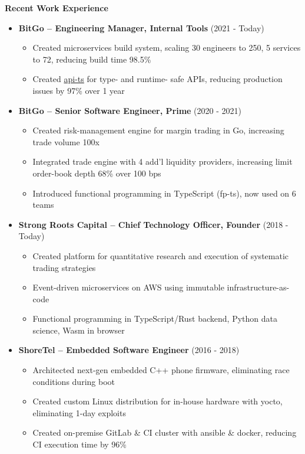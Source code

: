 \documentclass{report}
\begin{document}
\textbf{Recent Work Experience}
\begin{itemize}[label=]

\item \textbf{BitGo -- Engineering Manager, Internal Tools} (2021 - Today)
  \begin{itemize}[label=$\circ$]
  \item Created microservices build system, scaling 30 engineers to 250, 5 services to 72, reducing build time 98.5\%
  \item Created \href{https://github.com/BitGo/api-ts}{api-ts} for type- and runtime- safe APIs, reducing production issues by 97\% over 1 year
  \end{itemize}

\item \textbf{BitGo -- Senior Software Engineer, Prime} (2020 - 2021)
  \begin{itemize}[label=$\circ$]
  \item Created risk-management engine for margin trading in Go, increasing trade volume 100x
  \item Integrated trade engine with 4 add'l liquidity providers, increasing limit order-book depth 68\% over 100 bps
  \item Introduced functional programming in TypeScript (fp-ts), now used on 6 teams
  \end{itemize}

\item \textbf{Strong Roots Capital -- Chief Technology Officer, Founder} (2018 - Today)
  \begin{itemize}[label=$\circ$]
  \item Created platform for quantitative research and execution of systematic trading strategies
  \item Event-driven microservices on AWS using immutable infrastructure-as-code
  \item Functional programming in TypeScript/Rust backend, Python data science, Wasm in browser
  \end{itemize}

\item \textbf{ShoreTel -- Embedded Software Engineer} (2016 - 2018)
  \begin{itemize}[label=$\circ$]
  \item Architected next-gen embedded C++ phone firmware, eliminating race conditions during boot
  \item Created custom Linux distribution for in-house hardware with yocto, eliminating 1-day exploits
  \item Created on-premise GitLab \& CI cluster with ansible \& docker, reducing CI execution time by 96\%
  \end{itemize}


\end{itemize}
\end{document}
